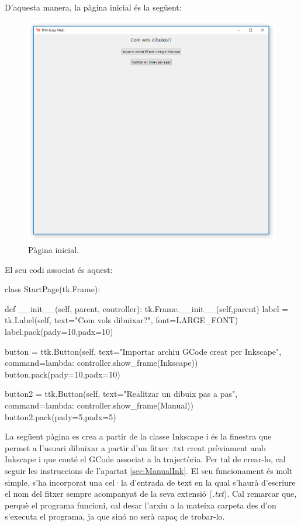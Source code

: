 D’aquesta manera, la pàgina inicial és la següent:

\begin{figure}[H]
	\centering
	\includegraphics[scale=0.9]{StartPage}
	\caption{Pàgina inicial.}
	\label{fig:StartPage}
\end{figure}

El seu codi associat és aquest:

\begin{python}
	class StartPage(tk.Frame):
	
		def __init__(self, parent, controller):
			tk.Frame.__init__(self,parent)
			label = tk.Label(self, text="Com vols dibuixar?", font=LARGE_FONT)
			label.pack(pady=10,padx=10)
			
			button = ttk.Button(self, text="Importar archiu GCode creat per Inkscape",
			command=lambda: controller.show_frame(Inkscape))
			button.pack(pady=10,padx=10)
			
			button2 = ttk.Button(self, text="Realitzar un dibuix pas a pas",
			command=lambda: controller.show_frame(Manual))
			button2.pack(pady=5,padx=5)
\end{python}

La següent pàgina es crea a partir de la classe Inkscape i és la finestra que permet a l’usuari dibuixar a partir d’un fitxer .txt creat prèviament amb Inkscape i que conté el GCode associat a la trajectòria. Per tal de crear-lo, cal seguir les instruccions de l’apartat \ref{sec:ManualInk}. El seu funcionament és molt simple, s’ha incorporat una cel·la d’entrada de text en la qual s’haurà d’escriure el nom del fitxer sempre acompanyat de la seva extensió (\emph{.txt}). Cal remarcar que, perquè el programa funcioni, cal desar l’arxiu a la mateixa carpeta des d’on s’executa el programa, ja que sinó no serà capaç de trobar-lo.
 
